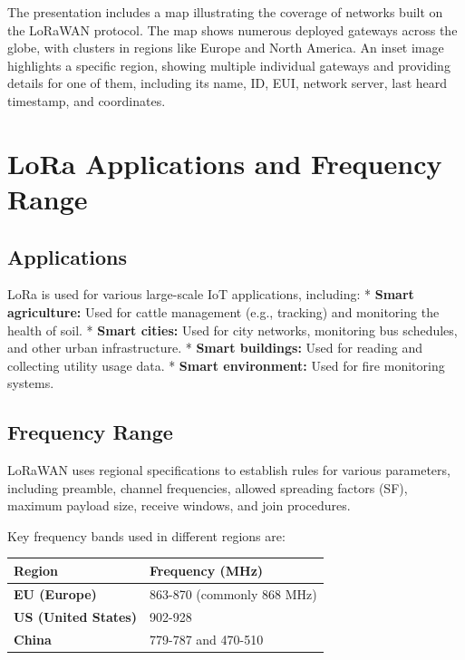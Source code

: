 \documentclass[a4paper, 12pt]{book} %
\begin{document}
The presentation includes a map illustrating the coverage of networks
built on the LoRaWAN protocol. The map shows numerous deployed gateways
across the globe, with clusters in regions like Europe and North
America. An inset image highlights a specific region, showing multiple
individual gateways and providing details for one of them, including its
name, ID, EUI, network server, last heard timestamp, and coordinates.

\chapter{LoRa Applications and Frequency
Range}\label{lora-applications-and-frequency-range}

\section{Applications}\label{applications}

LoRa is used for various large-scale IoT applications, including: *
\textbf{Smart agriculture:} Used for cattle management (e.g., tracking)
and monitoring the health of soil. * \textbf{Smart cities:} Used for
city networks, monitoring bus schedules, and other urban infrastructure.
* \textbf{Smart buildings:} Used for reading and collecting utility
usage data. * \textbf{Smart environment:} Used for fire monitoring
systems.

\section{Frequency Range}\label{frequency-range}

LoRaWAN uses regional specifications to establish rules for various
parameters, including preamble, channel frequencies, allowed spreading
factors (SF), maximum payload size, receive windows, and join
procedures.

Key frequency bands used in different regions are:

\begin{longtable}[]{@{}ll@{}}
\toprule\noalign{}
Region & Frequency (MHz) \\
\midrule\noalign{}
\endhead
\bottomrule\noalign{}
\endlastfoot
\textbf{EU (Europe)} & 863-870 (commonly 868 MHz) \\
\textbf{US (United States)} & 902-928 \\
\textbf{China} & 779-787 and 470-510 \\
\end{longtable}
\end{document}
